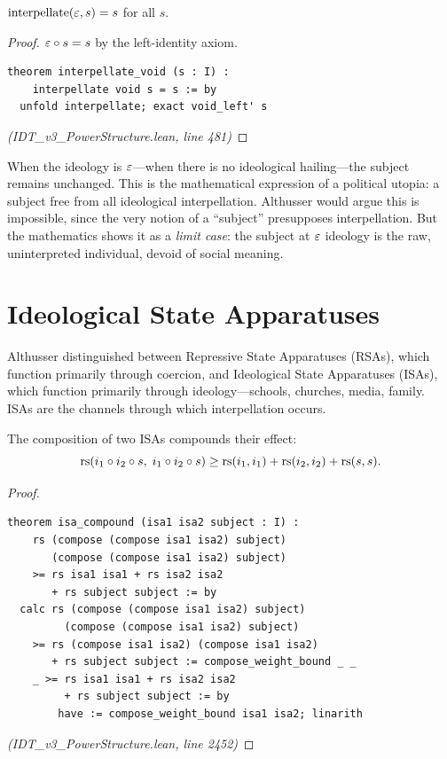 \begin{theorem}
\label{thm:interpellate-void}
$\mathrm{interpellate}(\varepsilon, s) = s$ for all $s$.
\end{theorem}

\begin{proof}
$\varepsilon \circ s = s$ by the left-identity axiom.
\begin{lstlisting}
theorem interpellate_void (s : I) :
    interpellate void s = s := by
  unfold interpellate; exact void_left' s
\end{lstlisting}
\textit{(IDT\_v3\_PowerStructure.lean, line 481)}
\end{proof}

\begin{interpretation}
When the ideology is $\varepsilon$---when there is no ideological hailing---the subject
remains unchanged. This is the mathematical expression of a political utopia:
a subject free from all ideological interpellation. Althusser would argue this
is impossible, since the very notion of a ``subject'' presupposes interpellation.
But the mathematics shows it as a \emph{limit case}: the subject at $\varepsilon$
ideology is the raw, uninterpreted individual, devoid of social meaning.
\end{interpretation}

\section{Ideological State Apparatuses}

Althusser distinguished between Repressive State Apparatuses (RSAs), which
function primarily through coercion, and Ideological State Apparatuses (ISAs),
which function primarily through ideology---schools, churches, media, family.
ISAs are the channels through which interpellation occurs.

\begin{theorem}
\label{thm:isa-compound}
The composition of two ISAs compounds their effect:
\[
  \mathrm{rs}(i_1 \circ i_2 \circ s,\; i_1 \circ i_2 \circ s)
  \geq \mathrm{rs}(i_1,i_1) + \mathrm{rs}(i_2,i_2) + \mathrm{rs}(s,s).
\]
\end{theorem}

\begin{proof}
\begin{lstlisting}
theorem isa_compound (isa1 isa2 subject : I) :
    rs (compose (compose isa1 isa2) subject)
       (compose (compose isa1 isa2) subject)
    >= rs isa1 isa1 + rs isa2 isa2
       + rs subject subject := by
  calc rs (compose (compose isa1 isa2) subject)
         (compose (compose isa1 isa2) subject)
    >= rs (compose isa1 isa2) (compose isa1 isa2)
       + rs subject subject := compose_weight_bound _ _
    _ >= rs isa1 isa1 + rs isa2 isa2
         + rs subject subject := by
        have := compose_weight_bound isa1 isa2; linarith
\end{lstlisting}
\textit{(IDT\_v3\_PowerStructure.lean, line 2452)}
\end{proof}

